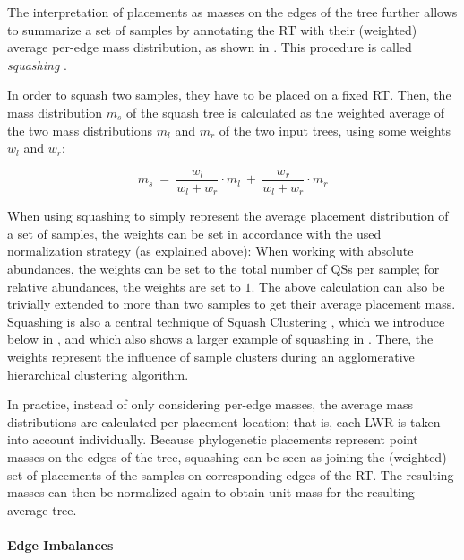 The interpretation of placements as masses on the edges of the tree further allows to summarize a set of samples
by annotating the \ac{RT} with their (weighted) average per-edge mass distribution, as shown in .
This procedure is called \emph{squashing} \cite{Matsen2011a}.

In order to squash two samples, they have to be placed on a fixed \ac{RT}.
Then, the mass distribution $m_s$ of the squash tree is calculated as
the weighted average of the two mass distributions $m_l$ and $m_r$ of the two input trees,
using some weights $w_l$ and $w_r$:

\begin{equation}
    \label{ch:Foundations:sec:PhylogeneticPlacement:eq:Squashing}
    m_s ~=~ \frac{w_l}{w_l + w_r} \cdot m_l ~+~ \frac{w_r}{w_l + w_r} \cdot m_r
\end{equation}

When using squashing to simply represent the average placement distribution of a set of samples,
the weights can be set in accordance with the used normalization strategy (as explained above):
When working with absolute abundances, the weights can be set to the total number of \acp{QS} per sample;
for relative abundances, the weights are set to $1$.
The above calculation can also be trivially extended to more than two samples to get their average placement mass.
Squashing is also a central technique of Squash Clustering \citep{Matsen2011a}, which we introduce below in
,
and which also shows a larger example of squashing in .
There, the weights represent the influence of sample clusters during an agglomerative hierarchical clustering algorithm.

In practice, instead of only considering per-edge masses,
the average mass distributions are calculated per placement location;
that is, each \ac{LWR} is taken into account individually.
Because phylogenetic placements represent point masses on the edges of the tree,
squashing can be seen as joining the (weighted) set of placements of the samples on corresponding edges of the \ac{RT}.
The resulting masses can then be normalized again to obtain unit mass for the resulting average tree.

\paragraph{Edge Imbalances}
\label{ch:Foundations:sec:PhylogeneticPlacement:sub:PlacementProcessing:par:EdgeImbalances}

